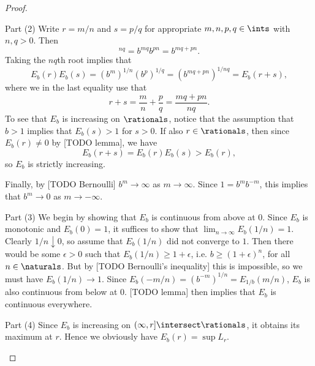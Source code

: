\documentclass[article, a4paper, 11pt, oneside]{memoir}
\numberwithin{equation}{chapter}
\begin{document}
\begin{proof}
\begin{proofsec}
        \item[Part (2)]
        Write $r = m/n$ and $s = p/q$ for appropriate $m,n,p,q \in \ints$ with $n,q > 0$. Then
        \begin{equation*}
            [ (b^m)^{1/n} (b^p)^{1/q} ]^{nq}
                = b^{mq} b^{pn}
                = b^{mq + pn}.
        \end{equation*}
        Taking the $nq$th root implies that
        \begin{equation*}
            E_b(r) E_b(s)
                = (b^m)^{1/n} (b^p)^{1/q}
                = (b^{mq+pn})^{1/nq}
                = E_b(r + s),
        \end{equation*}
        where we in the last equality use that
        \begin{equation*}
            r + s
                = \frac{m}{n} + \frac{p}{q}
                = \frac{mq + pn}{nq}.
        \end{equation*}
        To see that $E_b$ is increasing on $\rationals$, notice that the assumption that $b > 1$ implies that $E_b(s) > 1$ for $s > 0$. If also $r \in \rationals$, then since $E_b(r) \neq 0$ by [TODO lemma], we have
        \begin{equation*}
            E_b(r + s)
                = E_b(r) E_b(s)
                > E_b(r),
        \end{equation*}
        so $E_b$ is strictly increasing.

        Finally, by [TODO Bernoulli] $b^m \to \infty$ as $m \to \infty$. Since $1 = b^m b^{-m}$, this implies that $b^m \to 0$ as $m \to -\infty$.
        
        \item[Part (3)]
        We begin by showing that $E_b$ is continuous from above at $0$. Since $E_b$ is monotonic and $E_b(0) = 1$, it suffices to show that $\lim_{n\to\infty} E_b(1/n) = 1$. Clearly $1/n \downarrow 0$, so assume that $E_b(1/n)$ did not converge to $1$. Then there would be some $\epsilon > 0$ such that $E_b(1/n) \geq 1 + \epsilon$, i.e. $b \geq (1 + \epsilon)^n$, for all $n \in \naturals$. But by [TODO Bernoulli's inequality] this is impossible, so we must have $E_b(1/n) \to 1$. Since $E_b(-m/n) = (b^{-m})^{1/n} = E_{1/b}(m/n)$, $E_b$ is also continuous from below at $0$. [TODO lemma] then implies that $E_b$ is continuous everywhere.

        \item[Part (4)]
        Since $E_b$ is increasing on $(\infty,r] \intersect \rationals$, it obtains its maximum at $r$. Hence we obviously have $E_b(r) = \sup L_r$.


\end{proofsec}
\end{proof}
\end{document}
